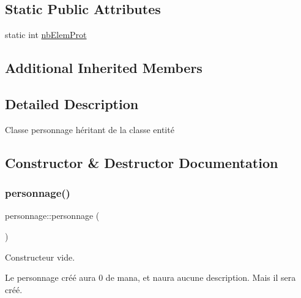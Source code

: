 \subsection*{Static Public Attributes}
\begin{DoxyCompactItemize}
\item 
static int \hyperlink{classpersonnage_ac16eee4c03f417dfce6b7c18f3ee682d}{nb\+Elem\+Prot}
\end{DoxyCompactItemize}
\subsection*{Additional Inherited Members}


\subsection{Detailed Description}
Classe personnage héritant de la classe entité 

\subsection{Constructor \& Destructor Documentation}
\mbox{\label{classpersonnage_acd9ca516f8c5c110687e5167dab8db59}} 
\subsubsection{\texorpdfstring{personnage()}{personnage()}\hspace{0.1cm}{\footnotesize\ttfamily [1/2]}}
{\footnotesize\ttfamily personnage\+::personnage (\begin{DoxyParamCaption}{ }\end{DoxyParamCaption})}



Constructeur vide. 

Le personnage créé aura 0 de mana, et n\textquotesingle{}aura aucune description. Mais il sera créé. \mbox{\label{classpersonnage_adec7b6f38637e7d176e054b68b0fcb23}} 
